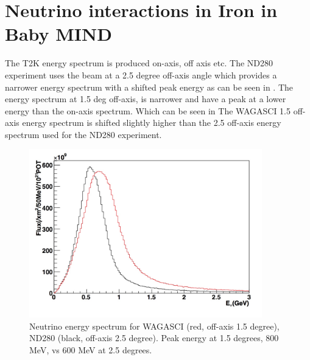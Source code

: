 

 
\section{Neutrino interactions in Iron in Baby MIND}

The T2K energy spectrum is produced on-axis, off axis etc. The ND280 experiment uses the beam at a 2.5 degree off-axis angle which provides a narrower energy spectrum with a shifted peak energy as can be seen in . The energy spectrum at 1.5 deg off-axis, is narrower and have a peak at a lower energy than the on-axis spectrum. Which can be seen in  The WAGASCI 1.5 off-axis energy spectrum is shifted slightly higher than the 2.5 off-axis energy spectrum used for the ND280 experiment.


\begin{figure}[h!]
\centering
\includegraphics[width=0.9\textwidth]{figures/NeutrinoChap/ND280vsWAGASCIspectrum.jpeg}
\caption{Neutrino energy spectrum for WAGASCI (red, off-axis 1.5 degree), ND280 (black, off-axis 2.5 degree). Peak energy at 1.5 degrees, 800 MeV, vs 600 MeV at 2.5 degrees.}
\label{fig:T2KAxis}
\end{figure}

